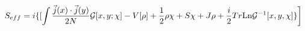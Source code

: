\begin{equation}
S_{eff} =  i \{ [  \int  \frac {\vec j(x) \cdot \vec j (y)}{2 N}
{\cal G}[x,y; \chi]
- V[\rho] + \frac{1}{2} \rho \chi+  S \chi + J {\rho} + \frac{i}{2} Tr {\rm
Ln}
{\cal G}^{-1} [x,y, \chi] \} \biggr]
\end{equation}

